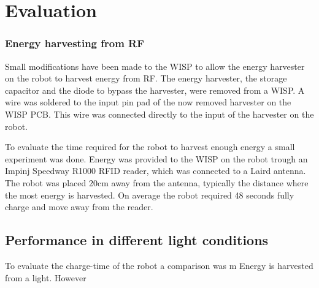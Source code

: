 \chapter{Evaluation} 


\subsection{Energy harvesting from RF}
Small modifications have been made to the WISP to allow the energy harvester on the robot to harvest energy from RF.
The energy harvester, the storage capacitor and the diode to bypass the harvester, were removed from a WISP.
A wire was soldered to the input pin pad of the now removed harvester on the WISP PCB.
This wire was connected directly to the input of the harvester on the robot.

To evaluate the time required for the robot to harvest enough energy a small experiment was done.
Energy was provided to the WISP on the robot trough an Impinj Speedway R1000 RFID reader, which was connected to a Laird antenna.
The robot was placed 20cm away from the antenna, typically the distance where the most energy is harvested.
On average the robot required 48 seconds fully charge and move away from the reader.

\section{Performance in different light conditions}

% 

To evaluate the charge-time of the robot a comparison was m
Energy is harvested from a light.
However 



